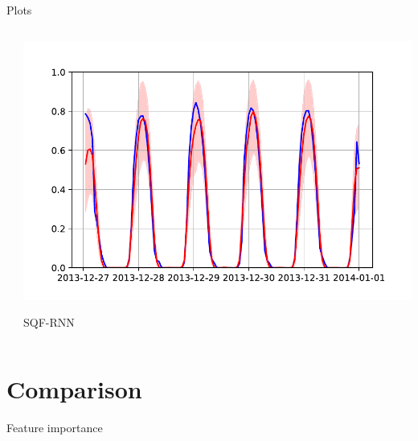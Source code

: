 \documentclass[10pt,aspectratio=169]{beamer}
\begin{document}
\begin{frame}{Plots}
\begin{columns}
\begin{column}{0.33\textwidth}
\begin{center}
            \end{center}
        \end{column}
        \begin{column}{0.33\textwidth}
            \includegraphics[width=\textwidth]{plots/sqf_rnn_plot_9.pdf}
            \begin{center}
                SQF-RNN
            \end{center}
        \end{column}
    \end{columns}
\end{frame}

\section{Comparison}

\begin{frame}{Feature importance}
    \begin{center}
        
    \end{center}
\end{frame}
\end{document}
